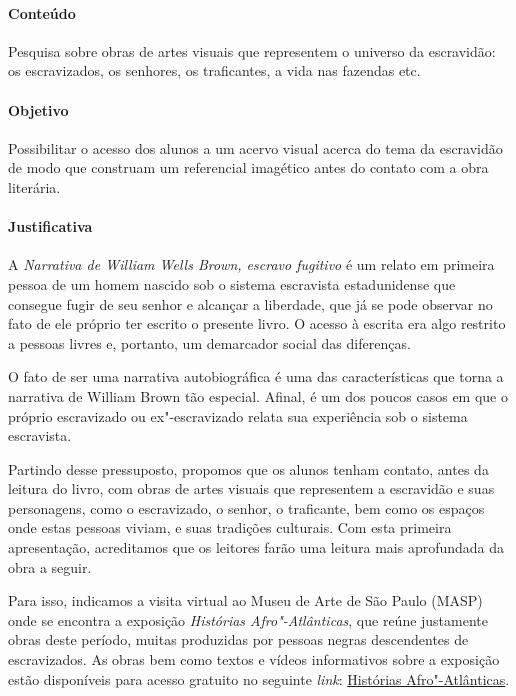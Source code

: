 \documentclass[11pt]{extarticle}
\begin{document}
 \paragraph{Conteúdo} Pesquisa sobre obras de artes visuais que representem 
 o universo da escravidão: os escravizados, os senhores, os traficantes,
 a vida nas fazendas etc.

 \paragraph{Objetivo} Possibilitar o acesso dos alunos a um acervo
 visual acerca do tema da escravidão de modo que construam um referencial
 imagético antes do contato com a obra literária. 

 \paragraph{Justificativa} A \emph{Narrativa de William Wells Brown, escravo fugitivo}
 é um relato em primeira pessoa de um homem nascido sob o sistema escravista
 estadunidense que consegue fugir de seu senhor e alcançar a liberdade, que já 
 se pode observar no fato de ele próprio ter escrito o presente livro. O acesso
 à escrita era algo restrito a pessoas livres e, portanto, um demarcador
 social das diferenças. 

 O fato de ser uma narrativa autobiográfica é uma das características que torna
 a narrativa de William Brown tão especial. Afinal, é um dos poucos casos
 em que o próprio escravizado ou ex"-escravizado relata sua experiência 
 sob o sistema escravista. 

 Partindo desse pressuposto, propomos que os alunos tenham contato, antes 
 da leitura do livro, com obras de artes visuais que representem 
 a escravidão e suas personagens, como o escravizado, o senhor, o traficante,
 bem como os espaços onde estas pessoas viviam, e suas tradições culturais. 
 Com esta primeira apresentação, acreditamos que os leitores farão uma leitura
 mais aprofundada da obra a seguir. 

 Para isso, indicamos a visita virtual ao Museu de Arte de São Paulo (MASP)
 onde se encontra a exposição \emph{Histórias Afro"-Atlânticas}, que reúne
 justamente obras deste período, muitas produzidas por pessoas negras
 descendentes de escravizados. As obras bem como textos e vídeos informativos sobre a 
 exposição estão disponíveis para acesso gratuito no seguinte \emph{link}:
 \href{https://masp.org.br/exposicoes/historias-afro-atlanticas}{Histórias Afro"-Atlânticas}. 
\end{document}
